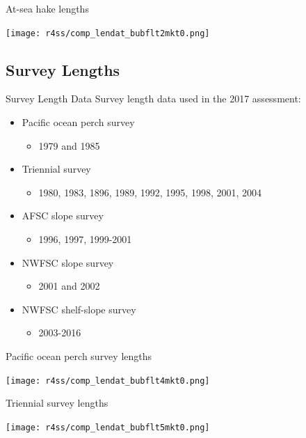 \documentclass[pdf]{beamer}\usepackage[]{graphicx}\usepackage[]{color}
\begin{document}
\begin{frame}{At-sea hake lengths}
  \begin{center}
    \texttt{[image: r4ss/comp\_lendat\_bubflt2mkt0.png]}
  \end{center}
\end{frame}

\subsection{Survey Lengths}
\begin{frame}{Survey Length Data}
  Survey length data used in the 2017 assessment:
  \begin{itemize}
    \item Pacific ocean perch survey
      \begin{itemize}
        \item 1979 and 1985
      \end{itemize}
    \item Triennial survey
      \begin{itemize}
        \item 1980, 1983, 1896, 1989, 1992, 1995, 1998, 2001, 2004
      \end{itemize}
    \item AFSC slope survey
      \begin{itemize}
        \item 1996, 1997, 1999-2001
      \end{itemize}
    \item NWFSC slope survey
      \begin{itemize}
        \item 2001 and 2002
      \end{itemize}
    \item NWFSC shelf-slope survey
      \begin{itemize}
        \item 2003-2016
      \end{itemize}
  \end{itemize}
\end{frame}

\begin{frame}{Pacific ocean perch survey lengths}
  \begin{center}
    \texttt{[image: r4ss/comp\_lendat\_bubflt4mkt0.png]}
  \end{center}
\end{frame}

\begin{frame}{Triennial survey lengths}
  \begin{center}
    \texttt{[image: r4ss/comp\_lendat\_bubflt5mkt0.png]}
  \end{center}
\end{frame}
\end{document}
